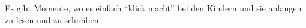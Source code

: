Es gibt Momente, wo es einfach ``klick macht'' bei den Kindern und sie anfangen zu lesen und zu schreiben.
